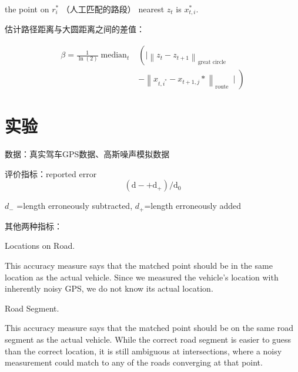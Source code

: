 the point on $ r_{i}^{*} $ （人工匹配的路段） nearest $ z_{t} $ is $ x_{t, i}^{*} $.

估计路径距离与大圆距离之间的差值：

$$ \begin{aligned} \beta=\frac{1}{\ln (2)} \operatorname{median}_{t} &\left(\mid\left\|z_{t}-z_{t+1}\right\|_{\text {great circle }}\right.\\ &\left.-\left\|x_{t, i^{*}}-x_{t+1, j} *\right\|_{\text {route }} \mid\right) \end{aligned} $$



\section{实验}

数据：真实驾车GPS数据、高斯噪声模拟数据

评价指标：reported error
  $$ \left(\mathrm{d}-+\mathrm{d}_{+}\right) / \mathrm{d}_{0} $$ 

  $d_{-}  $ =length erroneously subtracted,
  $ d_{+} $=length erroneously added



其他两种指标：

  Locations on Road. 
  \begin{remark}
      This accuracy measure
  says that the matched point should be in the
  same location as the actual vehicle. Since we
  measured the vehicle’s location with inherently
  noisy GPS, we do not know its actual location.
  \end{remark}

  Road Segment.
  \begin{remark}
      This accuracy measure says
  that the matched point should be on the same
  road segment as the actual vehicle. While the
  correct road segment is easier to guess than the
  correct location, it is still ambiguous at
  intersections, where a noisy measurement could
  match to any of the roads converging at that
  point.
  \end{remark}
  
   